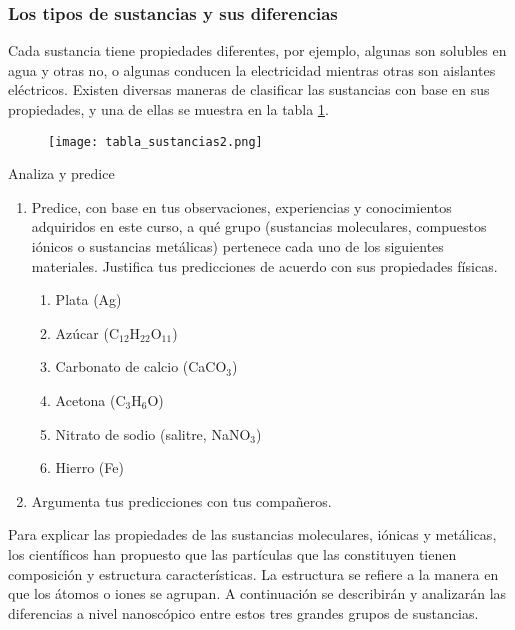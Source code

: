 \subsubsection{Los tipos de sustancias y sus diferencias}
Cada sustancia tiene propiedades diferentes, por ejemplo, algunas son solubles
en agua y otras no, o algunas conducen la electricidad mientras otras son aislantes
eléctricos. Existen diversas maneras de clasificar las sustancias con base en sus
propiedades, y una de ellas se muestra en la tabla \ref{tab:tabla_sustancias2}.

\begin{figure}[H]
    \centering
    \texttt{[image: tabla\_sustancias2.png]}
    \label{tab:tabla_sustancias2}
\end{figure}

\begin{boxK}
    Analiza y predice
    \begin{enumerate}
        \item Predice, con base en tus observaciones, experiencias y conocimientos adquiridos en este curso, a qué grupo
              (sustancias moleculares, compuestos iónicos o sustancias metálicas) pertenece cada uno de los siguientes materiales.
              Justifica tus predicciones de acuerdo con sus propiedades físicas.
              \begin{enumerate}
                  \item Plata (Ag)
                  \item Azúcar (C$_{12}$H$_{22}$O$_{11}$)
                  \item Carbonato de calcio (CaCO$_3$)
                  \item Acetona (C$_3$H$_6$O)
                  \item Nitrato de sodio (salitre, NaNO$_3$)
                  \item Hierro (Fe)
              \end{enumerate}
        \item Argumenta tus predicciones con tus compañeros.
    \end{enumerate}
\end{boxK}

Para explicar las propiedades de las sustancias moleculares, iónicas y metálicas, los científicos han propuesto
que las partículas que las constituyen tienen composición y estructura características. La estructura se refiere
a la manera en que los átomos o iones se agrupan. A continuación se describirán y analizarán las diferencias a
nivel nanoscópico entre estos tres grandes grupos de sustancias.



